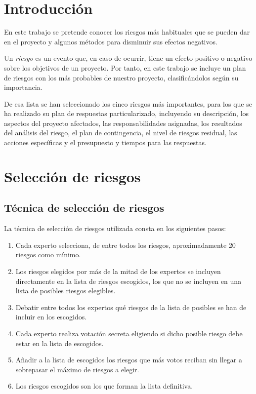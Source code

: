\documentclass[11pt,a4paper,spanish,twoside]{report}
\begin{document}
\tableofcontents
\listoftables
\listoffigures


\chapter*{Introducción}

En este trabajo se pretende conocer los riesgos más habituales que se pueden 
dar en el proyecto y algunos métodos para disminuir sus efectos negativos.

Un \emph{riesgo} es un evento que, en caso de ocurrir, tiene un efecto
positivo o negativo sobre los objetivos de un proyecto. Por tanto, en este
trabajo se incluye un plan de riesgos con los más probables de nuestro
proyecto, clasificándolos según su importancia.

De esa lista se han seleccionado los cinco riesgos más importantes, para los
que se ha realizado su plan de respuestas particularizado, incluyendo su 
descripción, los aspectos del proyecto afectados, las responsabilidades 
asignadas, los resultados del análisis del riesgo, el plan de contingencia,
el nivel de riesgos residual, las acciones específicas y el presupuesto y 
tiempos para las respuestas.

\chapter{Selección de riesgos}
\section{Técnica de selección de riesgos}
La técnica de selección de riesgos utilizada consta en los siguientes pasos:

\begin{enumerate}
\item Cada experto selecciona, de entre todos los riesgos, aproximadamente 
20 riesgos como mínimo.
\item Los riesgos elegidos por más de la mitad de los expertos se incluyen 
directamente en la lista de riesgos escogidos, los que no se incluyen en una 
lista de posibles riesgos elegibles.
\item Debatir entre todos los expertos qué riesgos de la lista de posibles se 
han de incluir en los escogidos. 
\item Cada experto realiza votación secreta eligiendo si dicho posible riesgo 
debe estar en la lista de escogidos.
\item Añadir a la lista de escogidos los riesgos que más votos reciban sin 
llegar a sobrepasar el máximo de riesgos a elegir.
\item Los riesgos escogidos son los que forman la lista definitiva.
\end{enumerate}
\end{document}
